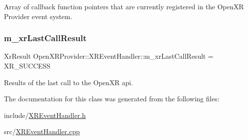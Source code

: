 Array of callback function pointers that are currently registered in the Open\+XR Provider event system. 

\mbox{\label{class_open_x_r_provider_1_1_x_r_event_handler_a51b30482e74bc38c40482700be47da85}} 
\subsubsection{\texorpdfstring{m\_xrLastCallResult}{m\_xrLastCallResult}}
{\footnotesize\ttfamily Xr\+Result Open\+X\+R\+Provider\+::\+X\+R\+Event\+Handler\+::m\+\_\+xr\+Last\+Call\+Result = X\+R\+\_\+\+S\+U\+C\+C\+E\+SS\hspace{0.3cm}{\ttfamily [private]}}



Results of the last call to the Open\+XR api. 



The documentation for this class was generated from the following files\+:\begin{DoxyCompactItemize}
\item 
include/\mbox{\hyperlink{_x_r_event_handler_8h}{X\+R\+Event\+Handler.\+h}}\item 
src/\mbox{\hyperlink{_x_r_event_handler_8cpp}{X\+R\+Event\+Handler.\+cpp}}\end{DoxyCompactItemize}
